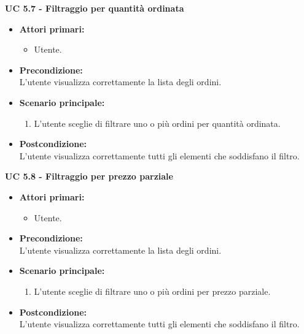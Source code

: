 \vspace{0.4cm}

\noindent \textbf{\large UC 5.7 - Filtraggio per quantità ordinata}
\label{uc:filtraggio-quantita-ordinata}
\begin{itemize}

	\item \textbf{Attori primari: }
		\begin{itemize}
			\item Utente.
		\end{itemize}

	\item \textbf{Precondizione: }\\[0.3cm]
		L'utente visualizza correttamente la lista degli ordini.

	\item \textbf{Scenario principale: }
		\begin{enumerate}
			\item L'utente sceglie di filtrare uno o più ordini per quantità ordinata.
		\end{enumerate}
		

	\item \textbf{Postcondizione: }\\[0.3cm]
		L'utente visualizza correttamente tutti gli elementi che soddisfano il filtro.

\end{itemize}

\vspace{0.4cm}

\noindent \textbf{\large UC 5.8 - Filtraggio per prezzo parziale}
\label{uc:filtraggio-prezzo-parziale-ord}
\begin{itemize}

	\item \textbf{Attori primari: }
		\begin{itemize}
			\item Utente.
		\end{itemize}

	\item \textbf{Precondizione: }\\[0.3cm]
		L'utente visualizza correttamente la lista degli ordini.

	\item \textbf{Scenario principale: }
		\begin{enumerate}
			\item L'utente sceglie di filtrare uno o più ordini per prezzo parziale.
		\end{enumerate}
		

	\item \textbf{Postcondizione: }\\[0.3cm]
		L'utente visualizza correttamente tutti gli elementi che soddisfano il filtro.

\end{itemize}

